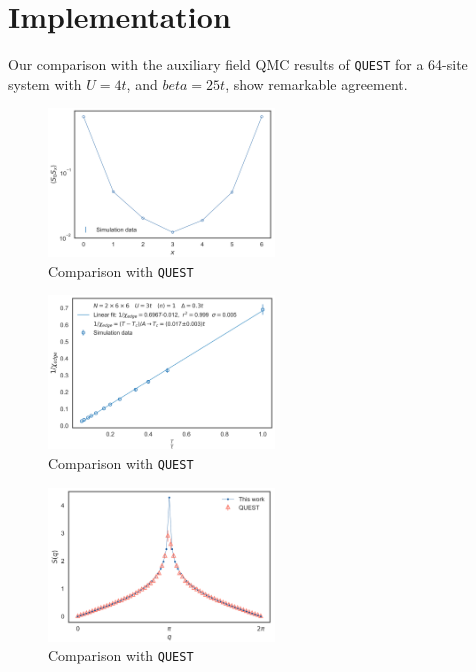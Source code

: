 
\section{Implementation}
\label{sec:imple}

Our comparison with the auxiliary field QMC results of \texttt{QUEST} for a 64-site system with $U = 4 t$, and $beta = 25 t$, show  remarkable agreement.
\begin{figure}[H]
  \centering
  \includegraphics[width=6cm]{images/LongitudinalProfile.png}
  \caption{Comparison with \texttt{QUEST}}
  \label{fig:blade_flow_pressure}
\end{figure}

\begin{figure}[H]
  \centering
  \includegraphics[width=6cm]{images/fityang2017.png}
  \caption{Comparison with \texttt{QUEST}}
  \label{fig:blade_flow_pressure}
\end{figure}
\begin{figure}[H]
  \centering
  \includegraphics[width=6cm]{images/s_compare.png}
  \caption{Comparison with \texttt{QUEST}}
  \label{fig:blade_flow_pressure}
\end{figure}



